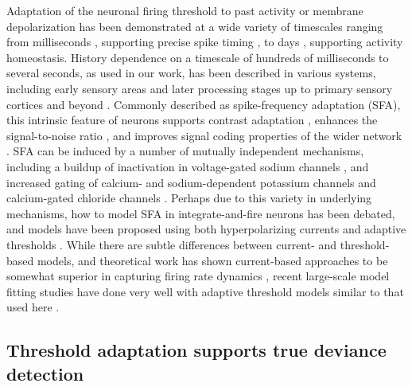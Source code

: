 \documentclass[9pt,lineno,onehalfspacing]{elife}
\begin{document}
Adaptation of the neuronal firing threshold to past activity or membrane depolarization has been demonstrated at a wide variety of timescales ranging from milliseconds \citep{Henze2001-xd, Badel2008-ld, Higgs2011-cy}, supporting precise spike timing \citep{Azouz2000-vh, Huang2016-ch}, to days \citep{OLeary2010-ar}, supporting activity homeostasis. History dependence on a timescale of hundreds of milliseconds to several seconds, as used in our work, has been described in various systems, including early sensory areas \citep{Baccus2002-jb, Wark2009-sf} and later processing stages up to primary sensory cortices and beyond \citep{Spain1991-fg, Sanchez-Vives2000-df, Henze2001-xd, La_Camera2006-dz, Abolafia2011-ig}. Commonly described as spike-frequency adaptation (SFA), this intrinsic feature of neurons supports contrast adaptation \citep{Sanchez-Vives2000-df, Wang2003-vv}, enhances the signal-to-noise ratio \citep{Wark2007-rx, Chacron2007-ak}, and improves signal coding properties of the wider network \citep{Prescott2008-oa, Bohte2012-gk, Lee2023-bu}. SFA can be induced by a number of mutually independent mechanisms, including a buildup of inactivation in voltage-gated sodium channels \citep{Fleidervish1996-ly, Miles2005-nz}, and increased gating of calcium- and sodium-dependent potassium channels \citep{Madison1984-zc, Schwindt1989-lv, Sanchez-Vives2000-rv, Wang2003-vv, Faber2005-vc} and calcium-gated chloride channels \citep{Ha2016-lc, Ha2017-bh}. Perhaps due to this variety in underlying mechanisms, how to model SFA in integrate-and-fire neurons has been debated, and models have been proposed using both hyperpolarizing currents \citep{Izhikevich2003-ty, Brette2005-ci} and adaptive thresholds \citep{Segundo1968-eu, Chacron2003-oz, Kobayashi2009-av}. While there are subtle differences between current- and threshold-based models, and theoretical work has shown current-based approaches to be somewhat superior in capturing firing rate dynamics \citep{Liu2001-yw, Benda2010-tz}, recent large-scale model fitting studies have done very well with adaptive threshold models similar to that used here \citep{Pozzorini2015-ei, Teeter2018-iz}.

\subsection{Threshold adaptation supports true deviance detection}
\end{document}
